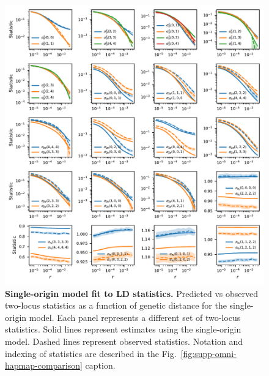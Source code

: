 \documentclass[]{article}
\begin{document}
\begin{figure}[ht]
    \centering
    \includegraphics{figures/supp-single-origin-fits.pdf}
    \caption{
        \textbf{Single-origin model fit to LD statistics.}
        Predicted vs observed two-locus statistics as a function of genetic
        distance for the single-origin model. Each panel represents a different
        set of two-locus statistics. Solid lines represent estimates using the
        single-origin model. Dashed lines represent observed statistics.
        Notation and indexing of statistics are described in the
        Fig.~\ref{fig:supp-omni-hapmap-comparison} caption.
    }
    \label{fig:supp-single-origin-fits}
\end{figure}
\end{document}
